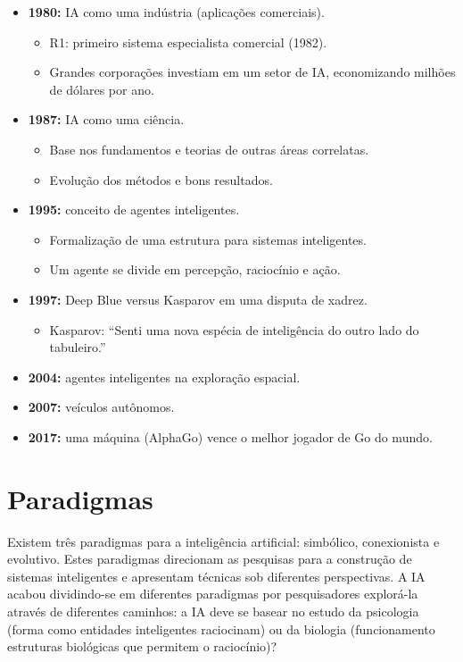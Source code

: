\begin{itemize}
	\item \textbf{1980:} IA como uma indústria (aplicações comerciais).
	\begin{itemize}
		\item R1: primeiro sistema especialista comercial (1982).
		\item Grandes corporações investiam em um setor de IA, economizando milhões de dólares por ano.
	\end{itemize}
	
	\item \textbf{1987:} IA como uma ciência.
	\begin{itemize}
		\item Base nos fundamentos e teorias de outras áreas correlatas.
		\item Evolução dos métodos e bons resultados.
	\end{itemize}
	
	\item \textbf{1995:} conceito de agentes inteligentes.
	\begin{itemize}
		\item Formalização de uma estrutura para sistemas inteligentes.
		\item Um agente se divide em percepção, raciocínio e ação.
	\end{itemize}
	
	\item \textbf{1997:} Deep Blue versus Kasparov em uma disputa de xadrez.
	\begin{itemize}
		\item Kasparov: ``Senti uma nova espécia de inteligência do outro lado do tabuleiro.''
	\end{itemize}
	
	\item \textbf{2004:} agentes inteligentes na exploração espacial.
	
	\item \textbf{2007:} veículos autônomos.
	
	\item \textbf{2017:} uma máquina (AlphaGo) vence o melhor jogador de Go do mundo.
\end{itemize}


\section{Paradigmas}

Existem três paradigmas para a inteligência artificial: simbólico, conexionista e evolutivo. Estes paradigmas direcionam as pesquisas para a construção de sistemas inteligentes e apresentam técnicas sob diferentes perspectivas. A IA acabou dividindo-se em diferentes paradigmas por pesquisadores explorá-la através de diferentes caminhos: a IA deve se basear no estudo da psicologia (forma como entidades inteligentes raciocinam) ou da biologia (funcionamento estruturas biológicas que permitem o raciocínio)?

